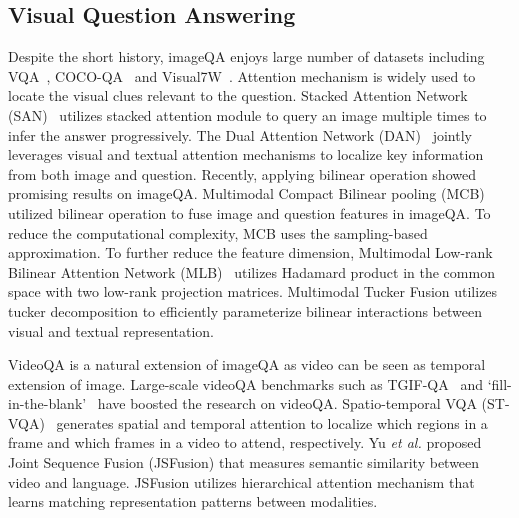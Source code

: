\documentclass[10pt,twocolumn,letterpaper]{article}
\begin{document}
\subsection{Visual Question Answering}
\label{ssec:2.1}

Despite the short history, imageQA enjoys large number of datasets including VQA~\cite{antol2015vqa}, COCO-QA~\cite{ren2015image} and Visual7W~\cite{zhu2016cvpr}. Attention mechanism is widely used to locate the visual clues relevant to the question. Stacked Attention Network (SAN)~\cite{SAN} utilizes stacked attention module to query an image multiple times to infer the answer progressively. The Dual Attention Network (DAN)~\cite{DAN} jointly leverages visual and textual attention mechanisms to localize key information from both image and question. Recently, applying bilinear operation showed promising results on imageQA. Multimodal Compact Bilinear pooling (MCB)~\cite{mcb} utilized bilinear operation to fuse image and question features in imageQA. To reduce the computational complexity, MCB uses the sampling-based approximation. To further reduce the feature dimension, Multimodal Low-rank Bilinear Attention Network (MLB)~\cite{MLB} utilizes Hadamard product in the common space with two low-rank projection matrices. Multimodal Tucker Fusion \cite{mutan} utilizes tucker decomposition \cite{Tucker1966} to efficiently parameterize bilinear interactions between visual and textual representation.

VideoQA is a natural extension of imageQA as video can be seen as temporal extension of image. Large-scale videoQA benchmarks such as TGIF-QA~\cite{jang-CVPR-2017} and \textquoteleft fill-in-the-blank\textquoteright~\cite{zhu2017uncovering} have boosted the research on videoQA. Spatio-temporal VQA (ST-VQA)~\cite{jang-CVPR-2017} generates spatial and temporal attention to localize which regions in a frame and which frames in a video to attend, respectively. Yu \textit{et al.} \cite{Yu_2018_ECCV} proposed Joint Sequence Fusion (JSFusion) that measures semantic similarity between video and language. JSFusion utilizes hierarchical attention mechanism that learns matching representation patterns between modalities.
\end{document}
